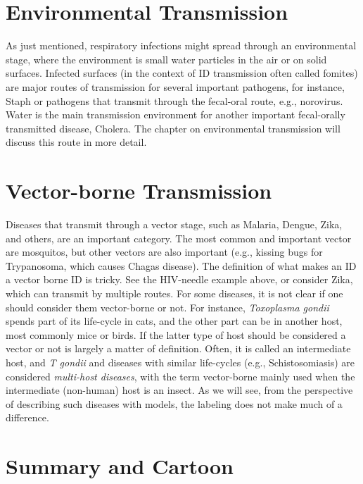 \documentclass[
]{book}
\begin{document}
\hypertarget{environmental-transmission}{%
\section{Environmental Transmission}\label{environmental-transmission}}

As just mentioned, respiratory infections might spread through an environmental stage, where the environment is small water particles in the air or on solid surfaces. Infected surfaces (in the context of ID transmission often called fomites) are major routes of transmission for several important pathogens, for instance, Staph or pathogens that transmit through the fecal-oral route, e.g., norovirus. Water is the main transmission environment for another important fecal-orally transmitted disease, Cholera. The chapter on environmental transmission will discuss this route in more detail.

\hypertarget{vector-borne-transmission}{%
\section{Vector-borne Transmission}\label{vector-borne-transmission}}

Diseases that transmit through a vector stage, such as Malaria, Dengue, Zika, and others, are an important category. The most common and important vector are mosquitos, but other vectors are also important (e.g., kissing bugs for Trypanosoma, which causes Chagas disease). The definition of what makes an ID a vector borne ID is tricky. See the HIV-needle example above, or consider Zika, which can transmit by multiple routes. For some diseases, it is not clear if one should consider them vector-borne or not. For instance, \emph{Toxoplasma gondii} spends part of its life-cycle in cats, and the other part can be in another host, most commonly mice or birds. If the latter type of host should be considered a vector or not is largely a matter of definition. Often, it is called an intermediate host, and \emph{T gondii} and diseases with similar life-cycles (e.g., Schistosomiasis) are considered \emph{multi-host diseases}, with the term vector-borne mainly used when the intermediate (non-human) host is an insect. As we will see, from the perspective of describing such diseases with models, the labeling does not make much of a difference.

\hypertarget{summary-and-cartoon-4}{%
\section{Summary and Cartoon}\label{summary-and-cartoon-4}}
\end{document}
